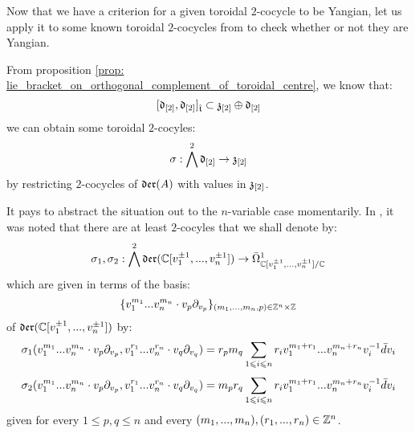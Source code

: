         Now that we have a criterion for a given toroidal $2$-cocycle to be Yangian, let us apply it to some known toroidal $2$-cocycles from \cite{billig_energy_momentum_tensor} to check whether or not they are Yangian. 
        \begin{example} \label{example: yangian_cocycles_counter_examples}
            From proposition \ref{prop: lie_bracket_on_orthogonal_complement_of_toroidal_centre}, we know that:
                $$[\mathfrak{d}_{[2]}, \mathfrak{d}_{[2]}]_{\hat{\mathfrak{t}}} \subset \mathfrak{z}_{[2]} \oplus \mathfrak{d}_{[2]}$$
            we can obtain some toroidal $2$-cocyles:
                $$\sigma: \bigwedge^2 \mathfrak{d}_{[2]} \to \mathfrak{z}_{[2]}$$
            by restricting $2$-cocycles of $\mathfrak{der}(A)$ with values in $\mathfrak{z}_{[2]}$.

            It pays to abstract the situation out to the $n$-variable case momentarily. In \cite[p. 5, below Equation 1.3]{billig_energy_momentum_tensor}, it was noted that there are at least $2$-cocyles that we shall denote by:
                $$\sigma_1, \sigma_2: \bigwedge^2 \mathfrak{der}(\mathbb{C}[v_1^{\pm 1}, ..., v_n^{\pm 1}]) \to \bar{\Omega}^1_{\mathbb{C}[v_1^{\pm 1}, ..., v_n^{\pm 1}]/\mathbb{C}}$$
            which are given in terms of the basis:
                $$\{ v_1^{m_1} ... v_n^{m_n} \cdot v_p \del_{v_p} \}_{(m_1, ..., m_n, p) \in \Z^n \x \Z}$$
            of $\mathfrak{der}(\mathbb{C}[v_1^{\pm 1}, ..., v_n^{\pm 1}])$ by:
                $$\sigma_1(v_1^{m_1} ... v_n^{m_n} \cdot v_p \partial_{v_p}, v_1^{r_1} ... v_n^{r_n} \cdot v_q \partial_{v_q}) = r_p m_q \sum_{1 \leqslant i \leqslant n} r_i v_1^{m_1 + r_1} ... v_n^{m_n + r_n} v_i^{-1} \bar{d}v_i$$
                $$\sigma_2(v_1^{m_1} ... v_n^{m_n} \cdot v_p \partial_{v_p}, v_1^{r_1} ... v_n^{r_n} \cdot v_q \partial_{v_q}) = m_p r_q \sum_{1 \leqslant i \leqslant n} r_i v_1^{m_1 + r_1} ... v_n^{m_n + r_n} v_i^{-1} \bar{d}v_i$$
            given for every $1 \leq p, q \leq n$ and every $(m_1, ..., m_n), (r_1, ..., r_n) \in \mathbb{Z}^n$. 


\end{example}
